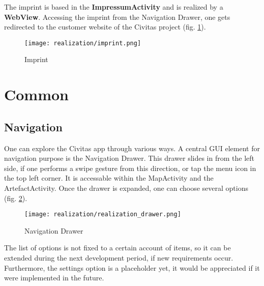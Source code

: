 The imprint is based in the \textbf{ImpressumActivity} and is realized by a \textbf{WebView}. Accessing the imprint from the Navigation Drawer, one gets redirected to the customer website of the Civitas project (fig. \ref{fig:imprint}).

\begin{figure}[H]
\centering
{}
  \texttt{[image: realization/imprint.png]}
  \caption[Imprint]{Imprint}
  \label{fig:imprint}
\endminipage\hfill
\end{figure}

\section{Common}

\subsection{Navigation}
One can explore the Civitas app through various ways. A central GUI element for navigation purpose is the Navigation Drawer. This drawer slides in from the left side, if one performs a swipe gesture from this direction, or tap the menu icon in the top left corner. It is accessable within the MapActivity and the ArtefactActivity. Once the drawer is expanded, one can choose several options (fig. \ref{fig:realization_drawer}).

\begin{figure}[H]
\centering
{}
  \texttt{[image: realization/realization\_drawer.png]}
  \caption{Navigation Drawer}\label{fig:realization_drawer}
\endminipage\hfill
\end{figure}

The list of options is not fixed to a certain account of items, so it can be extended during the next development period, if new requirements occur. Furthermore, the settings option is a placeholder yet, it would be appreciated if it were implemented in the future.



